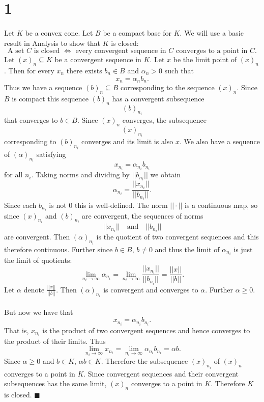 \documentclass[letterpaper,12pt,oneside,onecolumn]{article}
\begin{document}
\section*{1}
\paragraph{}
Let $K$ be a convex cone. Let $B$ be a compact base for $K$.  We will use a basic result in Analysis to show that $K$ is closed:
$$
\text{A set $C$ is closed $\iff$ every convergent sequence in $C$ converges to a point in $C$.}
$$
Let $(x)_n \subseteq K$ be a convergent sequence in $K$. Let $x$ be the limit point of $(x)_n$. Then for every $x_n$ there exists $b_n \in B$ and $\alpha_n > 0$ such that
$$x_n = \alpha_n b_n.$$
Thus we have a sequence $(b)_n \subseteq B$ corresponding to the sequence $(x)_n$. Since $B$ is compact this sequence $(b)_n$ has a convergent subsequence $$(b)_{n_i}$$ that converges to $b \in B$.
Since $(x)_n$ converges, the subsequence $$(x)_{n_i}$$ corresponding to $(b)_{n_i}$ converges and its limit is also $x$. We also have a sequence of $(\alpha)_{n_i}$ satisfying
$$x_{n_i} = \alpha_{n_i} b_{n_i}$$
for all $n_i$.
Taking norms and dividing by $||b_{n_i}||$ we obtain
$$\alpha_{n_i} = \frac{||x_{n_i}||}{||b_{n_i}||}.$$
Since each $b_{n_i}$ is not $0$ this is well-defined. The norm $||\cdot||$ is a continuous map, so since $(x)_{n_i}$ and $(b)_{n_i}$ are convergent, the sequences of norms
$$||x_{n_i}|| \quad \text{and}\quad ||b_{n_i}||$$
are convergent. Then $(\alpha)_{n_i}$ is the quotient of two convergent sequences and this therefore continuous. Further since $b \in B$, $b \neq 0 $ and thus the limit of $\alpha_{n_i}$ is just the limit of quotients:
$$\lim_{n_i \rightarrow \infty} \alpha_{n_i} = \lim_{n_i \rightarrow \infty} \frac{||x_{n_i}||}{||b_{n_i}||} = \frac{||x||}{||b||}.$$
Let $\alpha$ denote $\frac{||x||}{||b||}$. Then $(\alpha)_{n_i}$ is convergent and converges to $\alpha$. Further $\alpha \geq 0$.
\paragraph{}
But now we have that
$$x_{n_i} = \alpha_{n_i} b_{n_i}.$$
That is, $x_{n_i}$ is the product of two convergent sequences and hence converges to the product of their limits. Thus
$$\lim_{n_i \rightarrow \infty} x_{n_i} = \lim_{n_i \rightarrow \infty} \alpha_{n_i} b_{n_i} =\alpha b.$$
Since $\alpha \geq 0$ and $b \in K$, $\alpha b \in K$. Therefore the subsequence $(x)_{n_i}$ of $(x)_n$ converges to a point in $K$. Since convergent sequences and their convergent subsequences has the same limit, $(x)_n$ converges to a point in $K$. Therefore $K$ is closed. $\blacksquare$
\end{document}
